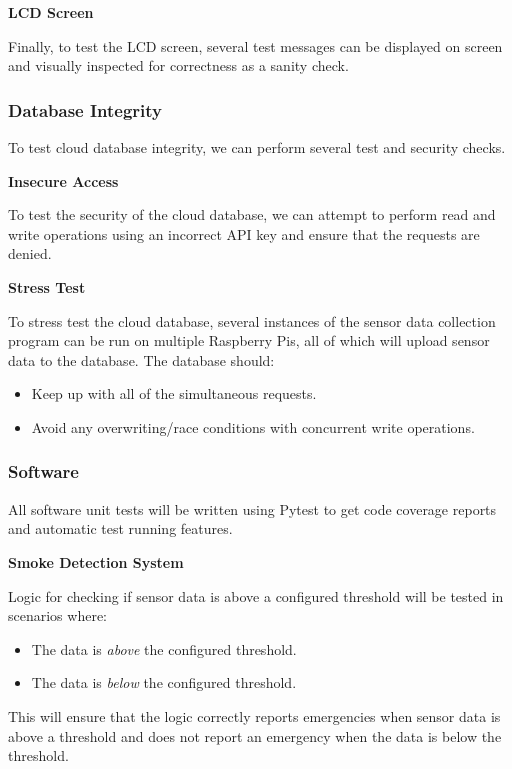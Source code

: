 \textbf{LCD Screen}

Finally, to test the LCD screen, several test messages can be displayed on screen and visually inspected for
correctness as a sanity check.

\subsubsection{Database Integrity}

To test cloud database integrity, we can perform several test and security checks.

\textbf{Insecure Access}

To test the security of the cloud database, we can attempt to perform read and write operations using an incorrect API
key and ensure that the requests are denied.

\textbf{Stress Test}

To stress test the cloud database, several instances of the sensor data collection program can be run on multiple
Raspberry Pis, all of which will upload sensor data to the database. The database should:

\begin{itemize}
    \item Keep up with all of the simultaneous requests.
    \item Avoid any overwriting/race conditions with concurrent write operations.
\end{itemize}

\subsubsection{Software}

All software unit tests will be written using Pytest to get code coverage reports and automatic test running features.

\textbf{Smoke Detection System}

Logic for checking if sensor data is above a configured threshold will be tested in scenarios where:

\begin{itemize}
    \item The data is \textit{above} the configured threshold.
    \item The data is \textit{below} the configured threshold.
\end{itemize}

This will ensure that the logic correctly reports emergencies when sensor data is above a threshold and does not report
an emergency when the data is below the threshold.


